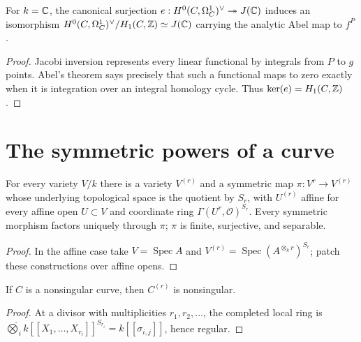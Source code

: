 \begin{theorem}\label{thm:milne-analytic-jacobian}
For $k=\mathbb{C}$, the canonical surjection $e:H^0(C,\Omega_C^1)^\vee\twoheadrightarrow J(\mathbb{C})$ induces an isomorphism $H^0(C,\Omega_C^1)^\vee/H_1(C,\mathbb{Z})\simeq J(\mathbb{C})$ carrying the analytic Abel map to $f^P$.
\end{theorem}

\begin{proof}

Jacobi inversion represents every linear functional by integrals from $P$ to $g$ points. Abel's theorem says precisely that such a functional maps to zero exactly when it is integration over an integral homology cycle. Thus $\ker(e)=H_1(C,\mathbb{Z})$.

\end{proof}


\section{The symmetric powers of a curve}
\begin{proposition}\label{prop:milne-symmetric-power}
For every variety $V/k$ there is a variety $V^{(r)}$ and a symmetric map $\pi:V^r\to V^{(r)}$ whose underlying topological space is the quotient by $S_r$, with $U^{(r)}$ affine for every affine open $U\subset V$ and coordinate ring $\Gamma(U^r,\mathcal O)^{S_r}$. Every symmetric morphism factors uniquely through $\pi$; $\pi$ is finite, surjective, and separable.
\end{proposition}

\begin{proof}
In the affine case take $V=\operatorname{Spec}A$ and $V^{(r)}=\operatorname{Spec}(A^{\otimes_k r})^{S_r}$; patch these constructions over affine opens.
\end{proof}

\begin{proposition}\label{prop:milne-symmetric-power-smooth-2}
If $C$ is a nonsingular curve, then $C^{(r)}$ is nonsingular.
\end{proposition}

\begin{proof}

At a divisor with multiplicities $r_1,r_2,\ldots$, the completed local ring is $\widehat{\bigotimes}_i k[[X_1,\ldots,X_{r_i}]]^{S_{r_i}}=k[[\sigma_{i,j}]]$, hence regular.

\end{proof}

